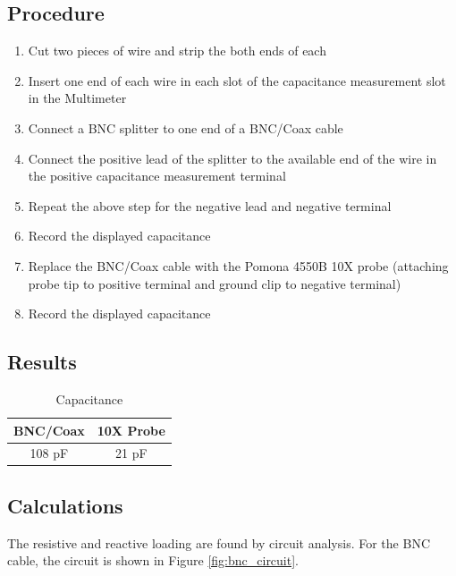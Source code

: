 \documentclass[12pt,letterpaper]{report}
\begin{document}
\subsection*{Procedure}
\begin{enumerate}
	\item Cut two pieces of wire and strip the both ends of each
	\item Insert one end of each wire in each slot of the capacitance measurement slot in the Multimeter
	\item Connect a BNC splitter to one end of a BNC/Coax cable
	\item Connect the positive lead of the splitter to the available end of the wire in the positive capacitance measurement terminal
	\item Repeat the above step for the negative lead and negative terminal
	\item Record the displayed capacitance
	\item Replace the BNC/Coax cable with the Pomona 4550B 10X probe (attaching probe tip to positive terminal and ground clip to negative terminal)
	\item Record the displayed capacitance
\end{enumerate}
\subsection*{Results}
\begin{center}
\begin{table}[ht]
\caption{Capacitance}
\centering
	\begin{tabular}{| c | c |}
	\hline
	
	BNC/Coax & 10X Probe \\
	\hline
	108 pF & 21 pF \\

	\hline
	\end{tabular}
\end{table}
\end{center}

\subsection*{Calculations}
The resistive and reactive loading are found by circuit analysis. For the BNC cable, the circuit is shown in Figure \ref{fig:bnc_circuit}.
\end{document}
